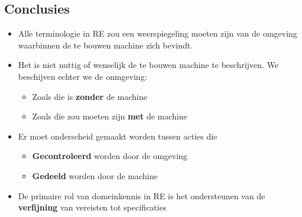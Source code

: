 \documentclass[../../main.tex]{subfiles}
\begin{document}
\subsection{Conclusies}
\begin{itemize}
	\item Alle terminologie in RE zou een weerspiegeling moeten zijn van de omgeving waarbinnen de te bouwen machine zich bevindt.
	\item Het is niet nuttig of wenselijk de te bouwen machine te beschrijven. We beschijven echter we de onmgeving:
	\begin{itemize}
		\item Zoals die is \textbf{zonder} de machine
		\item Zoals die zou moeten zijn \textbf{met} de machine
	\end{itemize}
	\item Er moet onderscheid gemaakt worden tussen acties die
	\begin{itemize}
		\item \textbf{Gecontroleerd} worden door de omgeving
		\item \textbf{Gedeeld} worden door de machine
	\end{itemize}
	\item De primaire rol van domeinkennis in RE is het ondersteunen van de \textbf{verfijning} van vereisten tot specificaties
\end{itemize}
\end{document}
